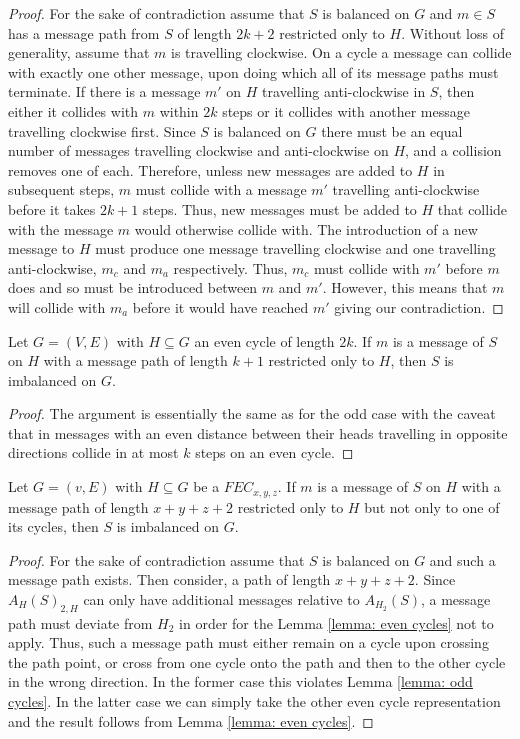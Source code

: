 \begin{proof}
    For the sake of contradiction assume that $S$ is balanced on $G$ and $m\in S$ has a message path from $S$ of length $2k+2$ restricted only to $H$. 
    Without loss of generality, assume that $m$ is travelling clockwise.
    On a cycle a message can collide with exactly one other message, upon doing which all of its message paths must terminate. 
    If there is a message $m'$ on $H$ travelling anti-clockwise in $S$, then either it collides with $m$ within $2k$ steps or it collides with another message travelling clockwise first. 
    Since $S$ is balanced on $G$ there must be an equal number of messages travelling clockwise and anti-clockwise on $H$, and a collision removes one of each.
    Therefore, unless new messages are added to $H$ in subsequent steps, $m$ must collide with a message $m'$ travelling anti-clockwise before it takes $2k+1$ steps.
    Thus, new messages must be added to $H$ that collide with the message $m$ would otherwise collide with. 
    The introduction of a new message to $H$ must produce one message travelling clockwise and one travelling anti-clockwise, $m_c$ and $m_a$ respectively. 
    Thus, $m_c$ must collide with $m'$ before $m$ does and so must be introduced between $m$ and $m'$. 
    However, this means that $m$ will collide with $m_a$ before it would have reached $m'$ giving our contradiction.
\end{proof}
\begin{lemma}
    Let $G=(V,E)$ with $H \subseteq G$ an even cycle of length $2k$. If $m$ is a message of $S$ on $H$ with a message path of length $k+1$ restricted only to $H$, then $S$ is imbalanced on $G$.
    \label{lemma: even cycles}
\end{lemma}
\begin{proof}
    The argument is essentially the same as for the odd case with the caveat that in messages with an even distance between their heads travelling in opposite directions collide in at most $k$ steps on an even cycle. 
\end{proof}
\begin{lemma}
    Let $G=(v,E)$ with $H\subseteq G$ be a $FEC_{x,y,z}$. If $m$ is a message of $S$ on $H$ with a message path of length $x+y+z+2$ restricted only to $H$ but not only to one of its cycles, then $S$ is imbalanced on $G$.
    \label{lemma: FEC}
\end{lemma}
\begin{proof}
    For the sake of contradiction assume that $S$ is balanced on $G$ and such a message path exists. Then consider, a path of length $x+y+z+2$. Since $A_{H}(S)_{2,H}$ can only have additional messages relative to $A_{H_2}(S)$, a message path must deviate from $H_2$ in order for the Lemma \ref{lemma: even cycles} not to apply. Thus, such a message path must either remain on a cycle upon crossing the path point, or cross from one cycle onto the path and then to the other cycle in the wrong direction. In the former case this violates Lemma \ref{lemma: odd cycles}. In the latter case we can simply take the other even cycle representation and the result follows from Lemma \ref{lemma: even cycles}.
\end{proof}
